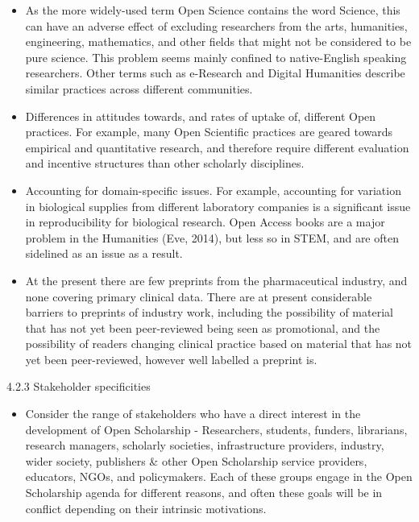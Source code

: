 \documentclass[]{article}
\providecommand{\tightlist}{%
  \setlength{\itemsep}{0pt}\setlength{\parskip}{0pt}}
\begin{document}
\begin{itemize}
\item
  As the more widely-used term Open Science contains the word Science,
  this can have an adverse effect of excluding researchers from the
  arts, humanities, engineering, mathematics, and other fields that
  might not be considered to be pure science. This problem seems mainly
  confined to native-English speaking researchers. Other terms such as
  e-Research and Digital Humanities describe similar practices across
  different communities.
\item
  Differences in attitudes towards, and rates of uptake of, different
  Open practices. For example, many Open Scientific practices are geared
  towards empirical and quantitative research, and therefore require
  different evaluation and incentive structures than other scholarly
  disciplines.
\item
  Accounting for domain-specific issues. For example, accounting for
  variation in biological supplies from different laboratory companies
  is a significant issue in reproducibility for biological research.
  Open Access books are a major problem in the Humanities (Eve, 2014),
  but less so in STEM, and are often sidelined as an issue as a result.
\item
  At the present there are few preprints from the pharmaceutical
  industry, and none covering primary clinical data. There are at
  present considerable barriers to preprints of industry work, including
  the possibility of material that has not yet been peer-reviewed being
  seen as promotional, and the possibility of readers changing clinical
  practice based on material that has not yet been peer-reviewed,
  however well labelled a preprint is.
\end{itemize}

4.2.3 Stakeholder specificities

\begin{itemize}
\tightlist
\item
  Consider the range of stakeholders who have a direct interest in the
  development of Open Scholarship - Researchers, students, funders,
  librarians, research managers, scholarly societies, infrastructure
  providers, industry, wider society, publishers \& other Open
  Scholarship service providers, educators, NGOs, and policymakers. Each
  of these groups engage in the Open Scholarship agenda for different
  reasons, and often these goals will be in conflict depending on their
  intrinsic motivations.
\end{itemize}
\end{document}
